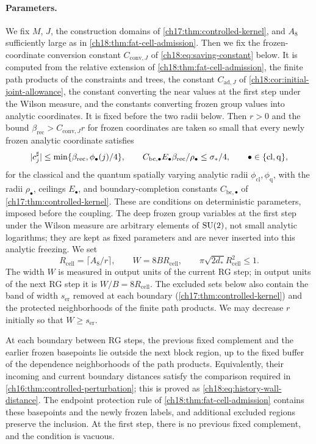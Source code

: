 \paragraph{Parameters.}
We fix $M$, $J$, the construction domains of \cref{ch17:thm:controlled-kernel}, and $A_8$ sufficiently large as in \cref{ch18:thm:fat-cell-admission}. Then we fix the frozen-coordinate conversion constant $C_{\mathrm{conv},J}$ of \eqref{ch18:eq:saving-constant} below. It is computed from the relative extension of \cref{ch18:thm:fat-cell-admission}, the finite path products of the constraints and trees, the constant $C_{\mathrm{ad},J}$ of \cref{ch18:cor:initial-joint-allowance}, the constant converting the near values at the first step under the Wilson measure, and the constants converting frozen group values into analytic coordinates. It is fixed before the two radii below. Then $r>0$ and the bound $\beta_{\mathrm{rec}}>C_{\mathrm{conv},J}r$ for frozen coordinates are taken so small that every newly frozen analytic coordinate satisfies
\[
 \lvert c_j^\sharp\rvert\le\min\{\beta_{\mathrm{rec}},\phi_\bullet(j)/4\},\qquad
 C_{\mathrm{bc},\bullet}E_\bullet\beta_{\mathrm{rec}}/\rho_\bullet\le\sigma_*/4,\qquad \bullet\in\{\mathrm{cl},\mathrm q\},
\]
for the classical and the quantum spatially varying analytic radii $\phi_{\mathrm{cl}},\phi_{\mathrm q}$, with the radii $\rho_\bullet$, ceilings $E_\bullet$, and boundary-completion constants $C_{\mathrm{bc},\bullet}$ of \cref{ch17:thm:controlled-kernel}. These are conditions on deterministic parameters, imposed before the coupling. The deep frozen group variables at the first step under the Wilson measure are arbitrary elements of $\mathrm{SU}(2)$, not small analytic logarithms; they are kept as fixed parameters and are never inserted into this analytic freezing. We set
\[
 R_{\mathrm{cell}}=\lceil A_8/r\rceil,\qquad
 W=8BR_{\mathrm{cell}},\qquad
 \pi\sqrt{2d_*}R_{\mathrm{cell}}^2\le1.
\]
The width $W$ is measured in output units of the current RG step; in output units of the next RG step it is $W/B=8R_{\mathrm{cell}}$. The excluded sets below also contain the band of width $s_{\mathrm{er}}$ removed at each boundary (\cref{ch17:thm:controlled-kernel}) and the protected neighborhoods of the finite path products. We may decrease $r$ initially so that $W\ge s_{\mathrm{er}}$.

At each boundary between RG steps, the previous fixed complement and the earlier frozen basepoints lie outside the next block region, up to the fixed buffer of the dependence neighborhoods of the path products. Equivalently, their incoming and current boundary distances satisfy the comparison required in \cref{ch16:thm:controlled-perturbation}; this is proved as \eqref{ch18:eq:history-wall-distance}. The endpoint protection rule of \cref{ch18:thm:fat-cell-admission} contains these basepoints and the newly frozen labels, and additional excluded regions preserve the inclusion. At the first step, there is no previous fixed complement, and the condition is vacuous.

